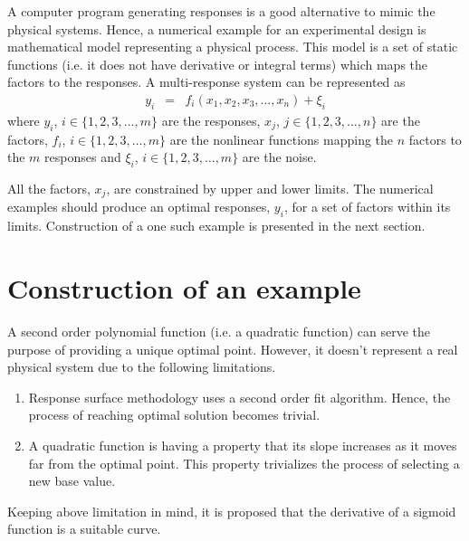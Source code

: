 \documentclass[letterpaper, 12pt]{article}
\begin{document}
A computer program generating responses is a good alternative to mimic the physical systems. Hence, a numerical example for an experimental design is mathematical model representing a physical process. This model is a set of static functions (i.e. it does not have derivative or integral terms) which maps the factors to the responses. A multi-response system can be represented as
\begin{eqnarray}
y_i &=& f_i(x_1, x_2, x_3	, \dots, x_n) + \xi_i \label{Eqn:Function}
\end{eqnarray}
\noindent where $y_i$, $i\in \{1,2,3, \dots, m\}$ are the responses, $x_j$, $j\in \{1,2,3, \dots, n\}$ are the factors, $f_i$, $i\in \{1,2,3, \dots, m\}$ are the nonlinear functions mapping the $n$ factors to the $m$ responses and $\xi_i$, $i\in \{1,2,3, \dots, m\}$ are the noise.
\par
All the factors, $x_j$, are constrained by upper and lower limits. The numerical examples should produce an optimal responses, $y_i$, for a set of factors within its limits. Construction of a one such example is presented in the next section.
\section{Construction of an example}
A second order polynomial function (i.e. a quadratic function) can serve the purpose of providing a unique optimal point. However, it doesn't represent a real physical system due to the following limitations.
\begin{enumerate}
	\item Response surface methodology uses a second order fit algorithm. Hence, the process of reaching optimal solution becomes trivial.
	\item A quadratic function is having a property that its slope increases as it moves far from the optimal point. This property trivializes the process of selecting a new base value.
\end{enumerate}
\par
Keeping above limitation in mind, it is proposed that the derivative of a sigmoid function is a suitable curve. 


\end{document}
